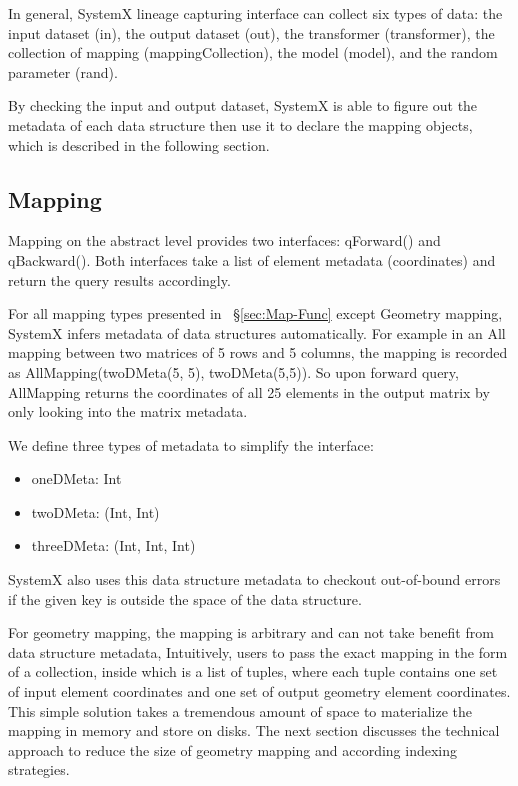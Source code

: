 \documentclass{sig-alternate}
\newenvironment{shortlist}{
        \vspace*{-0.5em}
  \begin{itemize}
  \setlength{\itemsep}{-0.1em}
}{
  \end{itemize}
        \vspace*{-0.5em}
}
\begin{document}
In general, SystemX lineage capturing interface can collect six types of data: 
the input dataset (in), the output dataset (out), the transformer (transformer), 
the collection of mapping (mappingCollection), the model (model), and the random 
parameter (rand).

By checking the input and output dataset, SystemX is able to figure out the metadata of each data structure then use
it to declare the mapping objects, which is described in the following section.

\subsection{Mapping}
\label{sec:Design-Mapping}
Mapping on the abstract level provides two interfaces: qForward() and qBackward(). Both interfaces
take a list of element metadata (coordinates) and return the query results accordingly.

For all mapping types presented in ~\S\ref{sec:Map-Func} except Geometry mapping, 
SystemX infers metadata of data structures automatically. 
For example in an All mapping between two matrices of 5 rows and 5 columns,
the mapping is recorded as AllMapping(twoDMeta(5, 5), twoDMeta(5,5)). 
So upon forward query, AllMapping returns the coordinates of all 25 elements in the output matrix by only looking into the matrix metadata.

We define three types of metadata to simplify the interface:
\begin{shortlist}
\item{} oneDMeta: Int
\item{} twoDMeta: (Int, Int)
\item{} threeDMeta: (Int, Int, Int)
\end{shortlist}  
SystemX also uses this data structure metadata to checkout out-of-bound errors if the given key is outside the space of the data structure.

For geometry mapping, the mapping is arbitrary and can not take benefit from data structure metadata, 
Intuitively, users to pass the exact mapping in the form of a collection, inside which is a list of tuples, where each tuple 
contains one set of input element coordinates and one set of output geometry element coordinates. 
This simple solution takes a tremendous amount of space to materialize the mapping in memory and store on disks.
The next section discusses the technical approach to reduce the size of geometry mapping and according indexing strategies.
\end{document}
